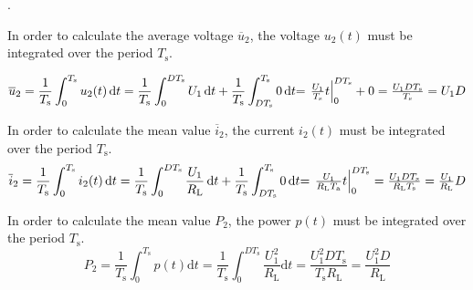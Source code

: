 .

\begin{solutionblock}
    In order to calculate the average voltage $\overline u_2$, the voltage $u_{\mathrm{2}}(t)$ must be integrated over the period $T_{\mathrm{s}}$.

    \begin{equation}
    \overline u_2 = \frac{1}{T_{\mathrm{s}}} \int_0^{ T_{\mathrm{s}}} u_2 (t) \, \mathrm{d}t = \frac{1}{ T_{\mathrm{s}}} \int_0^{D T_{\mathrm{s}}} U_1 \, \mathrm{d}t + \frac{1}{ T_{\mathrm{s}}} \int_{D  T_{\mathrm{s}}}^{ T_{\mathrm{s}}} 0 \, \mathrm{d}t$$
 $$= \left . \frac{U_1}{ T_{\mathrm{s}}} t \right |_0^{D  T_{\mathrm{s}}}  + 0 = \frac{U_1 D  T_{\mathrm{s}}}{ T_{\mathrm{s}}} = U_1 D
    \end{equation}

    In order to calculate the mean value $\overline i_2$, the current $i_{\mathrm{2}}(t)$ must be integrated over the period $T_{\mathrm{s}}$.
    \begin{equation}
 \overline i_2 = \frac{1}{ T_{\mathrm{s}}} \int_0^{ T_{\mathrm{s}}} i_2(t) \, \mathrm{d}t = \frac{1}{ T_{\mathrm{s}}}\int_0^{D  T_{\mathrm{s}}} \frac{U_1}{ R_{\mathrm{L}}} \, \mathrm{d}t + \frac{1}{ T_{\mathrm{s}}}\int_{D  T_{\mathrm{s}}}^{ T_{\mathrm{s}}} 0 \, \mathrm{d}t$$
 $$= \left . \frac{U_1}{ R_{\mathrm{L}}  T_{\mathrm{a}}}  t \right |_0^{D  T_{\mathrm{s}}} = \frac{U_1 D  T_{\mathrm{s}}}{ R_{\mathrm{L}}  T_{\mathrm{s}}} = \frac{U_1}{ R_{\mathrm{L}}} D
    \end{equation}

    In order to calculate the mean value $P_{\mathrm{2}}$, the power $p(t)$ must be integrated over the period $T_{\mathrm{s}}$.
    \begin{equation}
P_2 = \frac{1}{T_{\mathrm{s}}} \int_0^{T_{\mathrm{s}}} p(t) \mathrm{d}t = \frac{1}{T_{\mathrm{s}}} \int_0^{D T_{\mathrm{s}}} \frac{U_1^2}{ R_{\mathrm{L}}} \mathrm{d}t = \frac{U_1^2 D T_{\mathrm{s}}}{ T_{\mathrm{s}}  R_{\mathrm{L}}} = \frac{U_1^2 D}{ R_{\mathrm{L}}}
    \end{equation}
 
\end{solutionblock}


